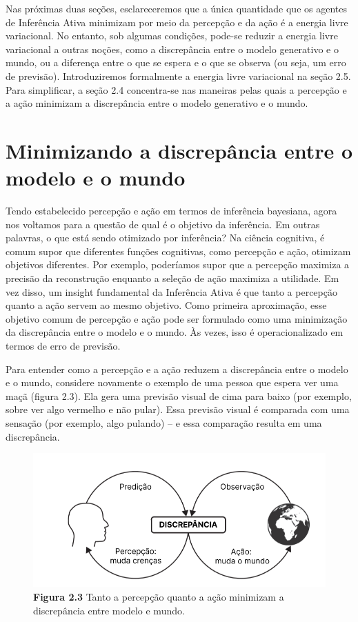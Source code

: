 \documentclass[
  12pt,
]{book}
\begin{document}
Nas próximas duas seções, esclareceremos que a única quantidade que os agentes de Inferência Ativa minimizam por meio da percepção e da ação é a energia livre variacional. No entanto, sob algumas condições, pode-se reduzir a energia livre variacional a outras noções, como a discrepância entre o modelo generativo e o mundo, ou a diferença entre o que se espera e o que se observa (ou seja, um erro de previsão). Introduziremos formalmente a energia livre variacional na seção 2.5. Para simplificar, a seção 2.4 concentra-se nas maneiras pelas quais a percepção e a ação minimizam a discrepância entre o modelo generativo e o mundo.

\hypertarget{minimizando-a-discrepuxe2ncia-entre-o-modelo-e-o-mundo}{%
\section{Minimizando a discrepância entre o modelo e o mundo}\label{minimizando-a-discrepuxe2ncia-entre-o-modelo-e-o-mundo}}

Tendo estabelecido percepção e ação em termos de inferência bayesiana, agora nos voltamos para a questão de qual é o objetivo da inferência. Em outras palavras, o que está sendo otimizado por inferência? Na ciência cognitiva, é comum supor que diferentes funções cognitivas, como percepção e ação, otimizam objetivos diferentes. Por exemplo, poderíamos supor que a percepção maximiza a precisão da reconstrução enquanto a seleção de ação maximiza a utilidade. Em vez disso, um insight fundamental da Inferência Ativa é que tanto a percepção quanto a ação servem ao mesmo objetivo. Como primeira aproximação, esse objetivo comum de percepção e ação pode ser formulado como uma minimização da discrepância entre o modelo e o mundo. Às vezes, isso é operacionalizado em termos de erro de previsão.

Para entender como a percepção e a ação reduzem a discrepância entre o modelo e o mundo, considere novamente o exemplo de uma pessoa que espera ver uma maçã (figura 2.3). Ela gera uma previsão visual de cima para baixo (por exemplo, sobre ver algo vermelho e não pular). Essa previsão visual é comparada com uma sensação (por exemplo, algo pulando) -- e essa comparação resulta em uma discrepância.

\begin{figure}
\centering
\includegraphics{images/Figura2_3.png}
\caption{\textbf{Figura 2.3} Tanto a percepção quanto a ação minimizam a discrepância entre modelo e mundo.}
\end{figure}
\end{document}
